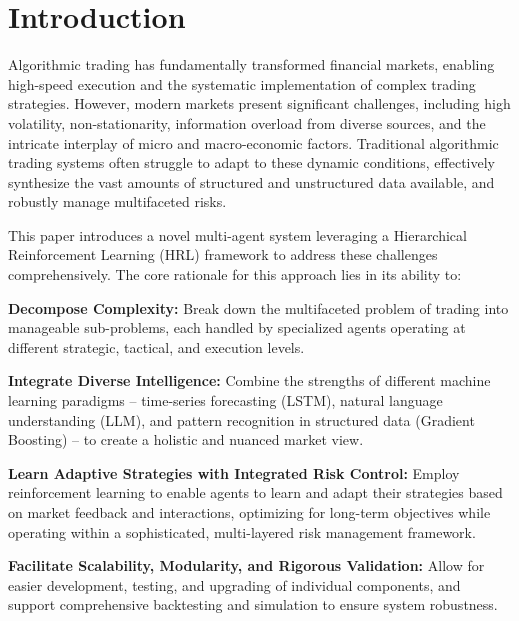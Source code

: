 \documentclass[11pt,a4paper]{article}
\begin{document}
\section{Introduction}

Algorithmic trading has fundamentally transformed financial markets, enabling high-speed execution and the systematic implementation of complex trading strategies. However, modern markets present significant challenges, including high volatility, non-stationarity, information overload from diverse sources, and the intricate interplay of micro and macro-economic factors. Traditional algorithmic trading systems often struggle to adapt to these dynamic conditions, effectively synthesize the vast amounts of structured and unstructured data available, and robustly manage multifaceted risks.

This paper introduces a novel multi-agent system leveraging a Hierarchical Reinforcement Learning (HRL) framework to address these challenges comprehensively. The core rationale for this approach lies in its ability to:
\item  \textbf{Decompose Complexity:} Break down the multifaceted problem of trading into manageable sub-problems, each handled by specialized agents operating at different strategic, tactical, and execution levels.
\item  \textbf{Integrate Diverse Intelligence:} Combine the strengths of different machine learning paradigms – time-series forecasting (LSTM), natural language understanding (LLM), and pattern recognition in structured data (Gradient Boosting) – to create a holistic and nuanced market view.
\item  \textbf{Learn Adaptive Strategies with Integrated Risk Control:} Employ reinforcement learning to enable agents to learn and adapt their strategies based on market feedback and interactions, optimizing for long-term objectives while operating within a sophisticated, multi-layered risk management framework.
\item  \textbf{Facilitate Scalability, Modularity, and Rigorous Validation:} Allow for easier development, testing, and upgrading of individual components, and support comprehensive backtesting and simulation to ensure system robustness.
\end{document}
